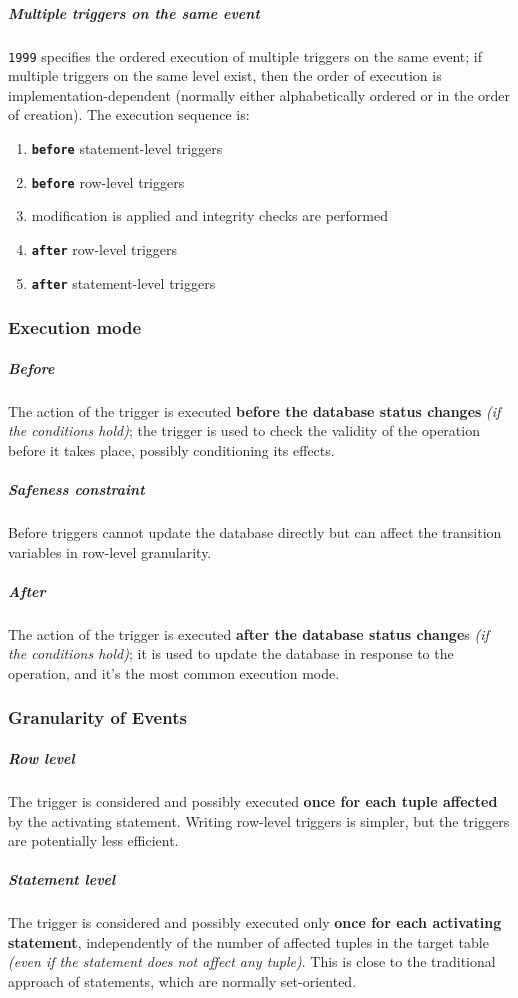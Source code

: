 \documentclass[english]{article}
\begin{document}
\subparagraph*{Multiple triggers on the same event}
\sql \texttt{1999} specifies the ordered execution of multiple triggers on the same event;
if multiple triggers on the same level exist, then the order of execution is implementation-dependent (normally either alphabetically ordered or in the order of creation).
The execution sequence is:

\begin{enumerate}
  \item \textbf{\texttt{before}} statement-level triggers
  \item \textbf{\texttt{before}} row-level triggers
  \item modification is applied and integrity checks are performed
  \item \textbf{\texttt{after}} row-level triggers
  \item \textbf{\texttt{after}} statement-level triggers
\end{enumerate}

\subsubsection{Execution mode}

\subparagraph*{Before}
The action of the trigger is executed \textbf{before the database status changes} \textit{(if the conditions hold)};
the trigger is used to check the validity of the operation before it takes place, possibly conditioning its effects.

\subparagraph*{Safeness constraint} Before triggers cannot update the database directly but can affect the transition variables in row-level granularity.

\subparagraph*{After}

The action of the trigger is executed \textbf{after the database status change}s \textit{(if the conditions hold)};
it is used to update the database in response to the operation, and it's the most common execution mode.

\subsubsection{Granularity of Events}

\subparagraph*{Row level}
The trigger is considered and possibly executed \textbf{once for each tuple affected} by the activating statement.
Writing row-level triggers is simpler, but the triggers are potentially less efficient.

\subparagraph*{Statement level}
The trigger is considered and possibly executed only \textbf{once for each activating statement}, independently of the number of affected tuples in the target table \textit{(even if the statement does not affect any tuple)}.
This is close to the traditional approach of \sql statements, which are normally set-oriented.
\end{document}
